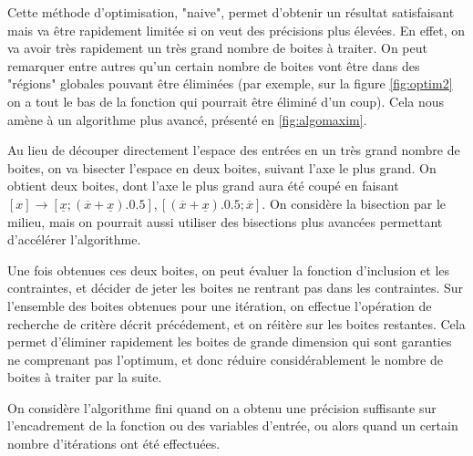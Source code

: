 Cette méthode d'optimisation, "naive", permet d'obtenir un résultat satisfaisant mais va être rapidement limitée si on veut des précisions plus élevées. En effet, on va avoir très rapidement un très grand nombre de boites à traiter. On peut remarquer entre autres qu'un certain nombre de boites vont être dans des "régions" globales pouvant être éliminées (par exemple, sur la figure \ref{fig:optim2} on a tout le bas de la fonction qui pourrait être éliminé d'un coup). Cela nous amène à un algorithme plus avancé, présenté en \ref{fig:algomaxim}.

Au lieu de découper directement l'espace des entrées en un très grand nombre de boites, on va bisecter l'espace en deux boites, suivant l'axe le plus grand. On obtient deux boites, dont l'axe le plus grand aura été coupé en faisant $[x] \longrightarrow {[\underline{x}; (\overline{x} + \underline{x}) . 0.5], [(\overline{x} + \underline{x}) . 0.5; \overline{x}]}$. On considère la bisection par le milieu, mais on pourrait aussi utiliser des bisections plus avancées permettant d'accélérer l'algorithme.

Une fois obtenues ces deux boites, on peut évaluer la fonction d'inclusion et les contraintes, et décider de jeter les boites ne rentrant pas dans les contraintes. Sur l'ensemble des boites obtenues pour une itération, on effectue l'opération de recherche de critère décrit précédement, et on réitère sur les boites restantes. Cela permet d'éliminer rapidement les boites de grande dimension qui sont garanties ne comprenant pas l'optimum, et donc réduire considérablement le nombre de boites à traiter par la suite.

On considère l'algorithme fini quand on a obtenu une précision suffisante sur l'encadrement de la fonction ou des variables d'entrée, ou alors quand un certain nombre d'itérations ont été effectuées.

